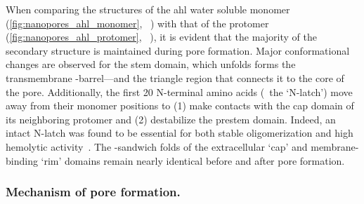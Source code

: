 When comparing the structures of the \gls{ahl} water soluble monomer (\cref{fig:nanopores_ahl_monomer},
~\cite{Sugawara-2015}) with that of the protomer (\cref{fig:nanopores_ahl_protomer},
~\cite{Song-1996}), it is evident that the majority of the secondary structure is maintained
during pore formation. Major conformational changes are observed for the stem domain, which unfolds forms the
transmembrane \tb-barrel---and the triangle region that connects it to the core of the pore. Additionally, the
first 20 N-terminal amino acids (\ie~the `N-latch') move away from their monomer positions to (1) make
contacts with the cap domain of its neighboring protomer and (2) destabilize the prestem domain. Indeed, an
intact N-latch was found to be essential for both stable oligomerization and high hemolytic
activity~\cite{Song-1996}. The \tb-sandwich folds of the extracellular `cap' and membrane-binding `rim'
domains remain nearly identical before and after pore formation.

\subsubsection{Mechanism of pore formation.}
%

